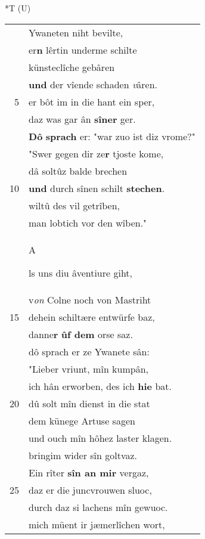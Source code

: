 \documentclass[8pt,a4paper,notitlepage]{article}
\begin{document}
\begin{table}[ht]
\begin{minipage}[t]{0.5\linewidth}
\end{minipage}
\hspace{0.5cm}
\begin{minipage}[t]{0.5\linewidth}
\small
\begin{center}*T (U)
\end{center}
\begin{tabular}{rl}
 & Ywaneten niht bevilte,\\ 
 & er\textbf{n} lêrtin underme schilte\\ 
 & künsteclîche gebâren\\ 
 & \textbf{und} der vîende schaden \textit{v}âren.\\ 
5 & er bôt im in die hant ein sper,\\ 
 & daz was gar ân \textbf{sîner} ger.\\ 
 & \textbf{Dô} \textbf{sprach} er: "war zuo ist diz vrome?"\\ 
 & "Swer gegen dir ze\textbf{r} tjoste kome,\\ 
 & dâ soltûz balde brechen\\ 
10 & \textbf{und} durch sînen schilt \textbf{stechen}.\\ 
 & wiltû des vil getrîben,\\ 
 & man lobtich vor den wîben."\\ 
 & \begin{large}A\end{large}ls uns diu âventiure giht,\\ 
 & v\textit{on} Colne noch von Mastriht\\ 
15 & dehein schiltære entwürfe baz,\\ 
 & danne\textbf{r} \textbf{ûf dem} orse saz.\\ 
 & dô sprach er ze Ywanete sân:\\ 
 & "Lieber vriunt, mîn kumpân,\\ 
 & ich hân erworben, des ich \textbf{hie} bat.\\ 
20 & dû solt mîn dienst in die stat\\ 
 & dem künege Artuse sagen\\ 
 & und ouch mîn hôhez laster klagen.\\ 
 & bringim wider sîn goltvaz.\\ 
 & Ein rîter \textbf{sîn an mir} vergaz,\\ 
25 & daz er die juncvrouwen sluoc,\\ 
 & durch daz si lachens mîn gewuoc.\\ 
 & mich müent ir jæmerlîchen wort,\\ 

\end{tabular}
\end{minipage}
\end{table}
\end{document}
